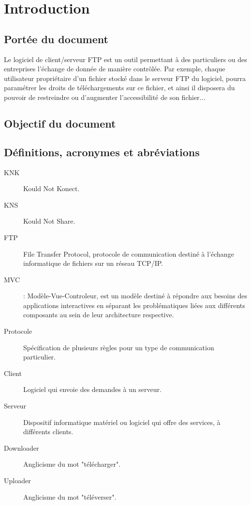 \documentclass[10pt,a4paper]{report}
\begin{document}

\section{Introduction}


\subsection{Portée du document}
Le logiciel de client/serveur FTP est un outil permettant à des particuliers ou des entreprises l'échange de donnée de manière contrôlée. Par exemple, chaque utilisateur propriétaire d'un fichier stocké dans le serveur FTP du logiciel, pourra paramétrer les droits de téléchargements sur ce fichier, et ainsi il disposera du pouvoir de restreindre ou d'augmenter l'accessibilité de son fichier...

\subsection{Objectif du document}

\subsection{Définitions, acronymes et abréviations}
\begin{description}
\item[KNK] Kould Not Konect.
\item[KNS] Kould Not Share.
\item[FTP] File Transfer Protocol, protocole de communication destiné à l'échange informatique de fichiers sur un réseau TCP/IP.
\item [MVC] : Modèle-Vue-Controleur, est un modèle destiné à répondre aux besoins des applications interactives en séparant les problématiques liées aux différents composants au sein de leur architecture respective.
\item[Protocole] Spécification de plusieurs règles pour un type de communication particulier.
\item[Client] Logiciel qui envoie des demandes à un serveur.
\item[Serveur] Dispositif informatique matériel ou logiciel qui offre des services, à différents clients.
\item[Downloader] Anglicisme du mot "télécharger".
\item[Uploader] Anglicisme du mot "téléverser".
\end{description}
\end{document}
